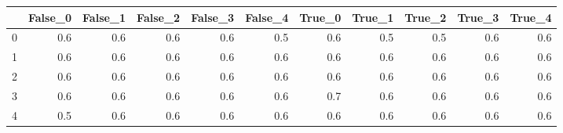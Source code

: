 \begin{tabular}{lrrrrrrrrrr}
\toprule
{} &  False\_0 &  False\_1 &  False\_2 &  False\_3 &  False\_4 &  True\_0 &  True\_1 &  True\_2 &  True\_3 &  True\_4 \\ \hline
\midrule
0 &      0.6 &      0.6 &      0.6 &      0.6 &      0.5 &     0.6 &     0.5 &     0.5 &     0.6 &     0.6 \\ \hline
1 &      0.6 &      0.6 &      0.6 &      0.6 &      0.6 &     0.6 &     0.6 &     0.6 &     0.6 &     0.6 \\ \hline
2 &      0.6 &      0.6 &      0.6 &      0.6 &      0.6 &     0.6 &     0.6 &     0.6 &     0.6 &     0.6 \\ \hline
3 &      0.6 &      0.6 &      0.6 &      0.6 &      0.6 &     0.7 &     0.6 &     0.6 &     0.6 &     0.6 \\ \hline
4 &      0.5 &      0.6 &      0.6 &      0.6 &      0.6 &     0.6 &     0.6 &     0.6 &     0.6 &     0.6 \\ \hline
\bottomrule
\end{tabular}
